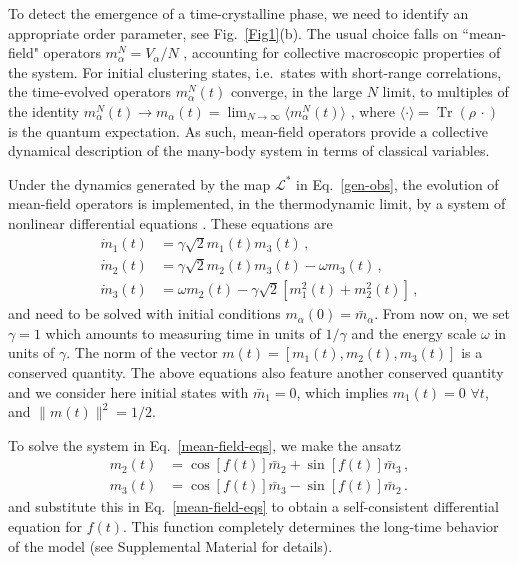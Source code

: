 \documentclass[prl,superscriptaddress,showpacs,longbibliography,reprint]{revtex4-2}
\DeclareMathOperator{\Tr}{Tr}
\begin{document}
 To detect the emergence of a time-crystalline phase, we need to identify an appropriate order parameter, see Fig.~\ref{Fig1}(b). The usual choice falls on ``mean-field" operators $m_\alpha^N=V_\alpha/N$ \cite{iemini2018,iemini2021}, accounting for collective macroscopic properties of the system. For initial clustering states, i.e.~states with short-range correlations, the time-evolved operators $m_\alpha^N(t)$ converge, in the large $N$ limit, to multiples of the identity $m_\alpha^N(t)\to m_\alpha(t)=\lim_{N\to\infty}\langle m_\alpha^N(t)\rangle$ \cite{lanford1969,benatti2018}, where  $\langle \cdot \rangle =\Tr(\rho \, \cdot)$ is the quantum expectation. As such, mean-field operators provide a collective dynamical description of the many-body system in terms of classical variables. 

Under the dynamics generated by the map $\mathcal{L}^*$ in Eq.~\eqref{gen-obs}, the evolution of mean-field operators is implemented, in the thermodynamic limit, by a system of nonlinear differential equations \cite{benatti2018,carollo2021}. These equations are
\begin{equation}
\begin{split}
 \dot{m}_{1}(t)&=\gamma\sqrt{2}m_1(t)m_3(t)\, ,\\
  \dot{m}_{2}(t)&=\gamma\sqrt{2}m_2(t)m_3(t)-\omega m_3(t)\, ,\\
   \dot{m}_{3}(t)&=\omega m_2(t) -\gamma \sqrt{2}\left[m_1^2(t)+m_2^2(t)\right]\, ,
 \label{mean-field-eqs}
 \end{split}
\end{equation}
and need to be solved with initial conditions $m_\alpha(0)=\bar{m}_\alpha$. From now on, we set $\gamma=1$ which amounts to measuring time in units of $1/\gamma$ and the energy scale $\omega$ in units of $\gamma$. The norm of the vector $m(t)=[m_1(t),m_2(t),m_3(t)]$ is a conserved quantity. The above equations also feature another conserved quantity \cite{iemini2018} and we consider here initial states with $\bar{m}_1=0$, which implies $m_1(t)=0$ $\forall t$, and $\|m(t)\|^2=1/2$. 

To solve the system in Eq.~\eqref{mean-field-eqs}, we make the ansatz
\begin{equation}
\begin{split}
    m_2(t)&=\cos [f(t)]\bar{m}_2+\sin[f(t)]\bar{m}_3\, ,\\
    m_3(t)&=\cos [f(t)]\bar{m}_3-\sin[f(t)]\bar{m}_2\, .
\end{split}
    \label{solution}
\end{equation}
and substitute this in Eq.~\eqref{mean-field-eqs} to obtain a self-consistent differential equation for $f(t)$. This function completely determines the long-time behavior of the model (see Supplemental Material \cite{SM} for details). 
\end{document}

